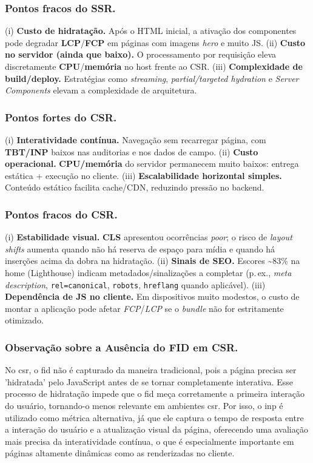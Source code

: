 \subsubsection{Pontos fracos do SSR.}
(i) \textbf{Custo de hidratação.} Após o HTML inicial, a ativação dos componentes pode degradar \textbf{LCP}/\textbf{FCP} em páginas com imagens \emph{hero} e muito JS.  
(ii) \textbf{Custo no servidor (ainda que baixo).} O processamento por requisição eleva discretamente \textbf{CPU}/\textbf{memória} no host frente ao CSR.  
(iii) \textbf{Complexidade de build/deploy.} Estratégias como \emph{streaming}, \emph{partial/targeted hydration} e \emph{Server Components} elevam a complexidade de arquitetura.

\subsubsection{Pontos fortes do CSR.}
(i) \textbf{Interatividade contínua.} Navegação sem recarregar página, com \textbf{TBT/INP} baixos nas auditorias e nos dados de campo.  
(ii) \textbf{Custo operacional.} \textbf{CPU/memória} do servidor permanecem muito baixos: entrega estática + execução no cliente.  
(iii) \textbf{Escalabilidade horizontal simples.} Conteúdo estático facilita cache/CDN, reduzindo pressão no backend.

\subsubsection{Pontos fracos do CSR.}
(i) \textbf{Estabilidade visual.} \textbf{CLS} apresentou ocorrências \textit{poor}; o risco de \emph{layout shifts} aumenta quando não há reserva de espaço para mídia e quando há inserções acima da dobra na hidratação.  
(ii) \textbf{Sinais de SEO.} Escores \textasciitilde83\% na home (Lighthouse) indicam metadados/sinalizações a completar (p.\,ex., \emph{meta description}, \texttt{rel=canonical}, \texttt{robots}, \texttt{hreflang} quando aplicável).  
(iii) \textbf{Dependência de JS no cliente.} Em dispositivos muito modestos, o custo de montar a aplicação pode afetar \textit{FCP}/\textit{LCP} se o \emph{bundle} não for estritamente otimizado.

\subsubsection{Observação sobre a Ausência do FID em CSR.} 
No \acrshort{csr}, o \acrfull{fid} não é capturado da maneira tradicional, pois a página precisa ser 'hidratada' pelo JavaScript antes de se tornar completamente interativa. Esse processo de hidratação impede que o \acrshort{fid} meça corretamente a primeira interação do usuário, tornando-o menos relevante em ambientes \acrshort{csr}. Por isso, o \acrfull{inp} é utilizado como métrica alternativa, já que ele captura o tempo de resposta entre a interação do usuário e a atualização visual da página, oferecendo uma avaliação mais precisa da interatividade contínua, o que é especialmente importante em páginas altamente dinâmicas como as renderizadas no cliente.


